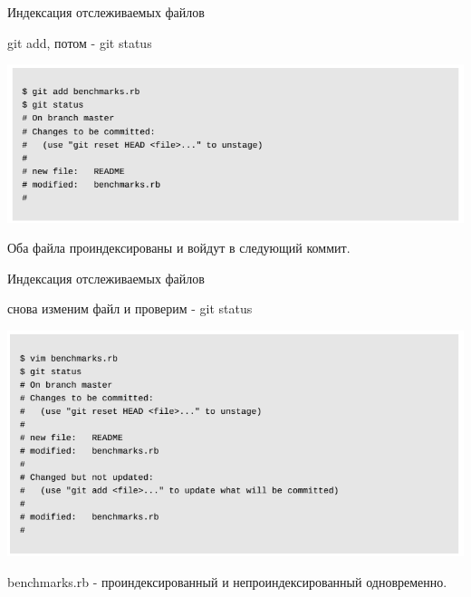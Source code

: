 \documentclass{beamer}
\begin{document}
\begin{frame}{Индексация отслеживаемых файлов}
\begin{block}{git add, потом - git status}
\begin{center}
\includegraphics[scale=0.5]{images/git-index-2.png}
\end{center}
\end{block}
Оба файла проиндексированы и войдут в следующий коммит. 
\end{frame}

\begin{frame}{Индексация отслеживаемых файлов}
\begin{block}{снова изменим файл и проверим - git status}
\begin{center}
\includegraphics[scale=0.5]{images/git-index-3.png}
\end{center}
\end{block}
benchmarks.rb - проиндексированный и непроиндексированный одновременно.
\end{frame}
\end{document}
